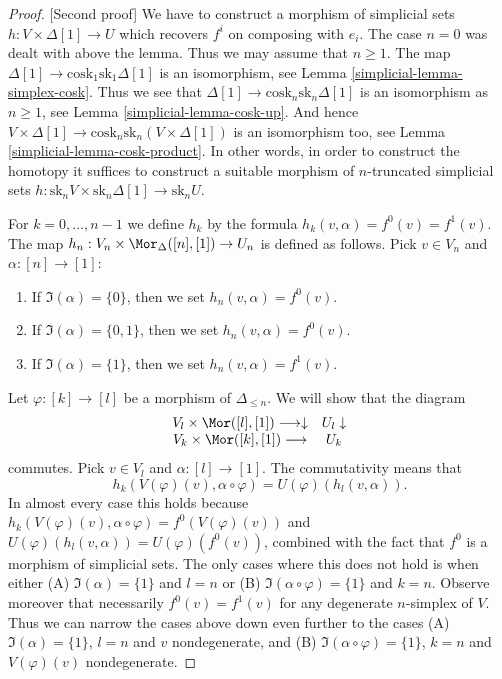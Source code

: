 \begin{proof}
[Second proof]
We have to construct a morphism of simplicial sets
$h : V \times \Delta[1] \to U$ which recovers $f^i$ on composing with $e_i$.
The case $n = 0$ was dealt with above the lemma.
Thus we may assume that $n \geq 1$.
The map $\Delta[1] \to \text{cosk}_1 \text{sk}_1 \Delta[1]$
is an isomorphism, see Lemma \ref{simplicial-lemma-simplex-cosk}.
Thus we see that $\Delta[1] \to \text{cosk}_n \text{sk}_n \Delta[1]$
is an isomorphism as $n \geq 1$, see
Lemma \ref{simplicial-lemma-cosk-up}. And hence $V \times \Delta[1] \to
\text{cosk}_n \text{sk}_n (V \times \Delta[1])$
is an isomorphism too, see Lemma \ref{simplicial-lemma-cosk-product}.
In other words, in order to construct the homotopy
it suffices to construct a suitable
morphism of $n$-truncated simplicial sets
$h : \text{sk}_n V \times \text{sk}_n \Delta[1] \to \text{sk}_n U$.

\medskip\noindent
For $k = 0, \ldots, n - 1$ we define $h_k$ by the
formula $h_k(v, \alpha) = f^0(v) = f^1(v)$.
The map $h_n : V_n \times \Mor_{\Delta}([n], [1]) \to U_n$
is defined as follows. Pick $v \in V_n$ and $\alpha : [n] \to [1]$:
\begin{enumerate}
\item If $\Im(\alpha) = \{0\}$, then we set $h_n(v, \alpha) = f^0(v)$.
\item If $\Im(\alpha) = \{0, 1\}$, then we set $h_n(v, \alpha) = f^0(v)$.
\item If $\Im(\alpha) = \{1\}$, then we set $h_n(v, \alpha) = f^1(v)$.
\end{enumerate}
Let $\varphi : [k] \to [l]$ be a morphism of $\Delta_{\leq n}$.
We will show that the diagram
$$
\begin{array}{cc}V_{l} \times \Mor([l], [1]) \longrightarrow\downarrow & U_{l} \downarrow \\ V_{k} \times \Mor([k], [1]) \longrightarrow & U_{k}\end{array}
$$
commutes.
Pick $v \in V_{l}$ and $\alpha : [l] \to [1]$.
The commutativity means that
$$
h_k(V(\varphi)(v), \alpha \circ \varphi)
=
U(\varphi)(h_l(v, \alpha)).
$$
In almost every case this holds because
$h_k(V(\varphi)(v), \alpha \circ \varphi) = f^0(V(\varphi)(v))$
and $U(\varphi)(h_l(v, \alpha)) = U(\varphi)(f^0(v))$, combined
with the fact that $f^0$ is a morphism of simplicial sets.
The only cases where this does not hold is when
either (A) $\Im(\alpha) = \{1\}$ and $l = n$
or (B) $\Im(\alpha \circ \varphi) = \{1\}$ and $k = n$.
Observe moreover that necessarily $f^0(v) = f^1(v)$
for any degenerate $n$-simplex of $V$.
Thus we can narrow the cases above down even further
to the cases (A) $\Im(\alpha) = \{1\}$, $l = n$
and $v$ nondegenerate, and (B)
$\Im(\alpha \circ \varphi) = \{1\}$, $k = n$
and $V(\varphi)(v)$ nondegenerate.


\end{proof}
